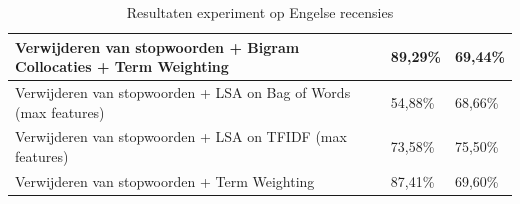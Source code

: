 \begin{table}[h]
\begin{adjustbox}{width=1\textwidth}
\begin{tabular}{|l|l|l|}
Verwijderen van stopwoorden + Bigram Collocaties + Term Weighting                   & 89,29\%                               & 69,44\%                      \\ \hline
Verwijderen van stopwoorden + LSA on Bag of Words (max features)                    & 54,88\%                               & 68,66\%                      \\ \hline
Verwijderen van stopwoorden + LSA on TFIDF (max features)                           & 73,58\%                               & 75,50\%                      \\ \hline
Verwijderen van stopwoorden + Term Weighting                                        & 87,41\%                               & 69,60\%                      \\ \hline
\end{tabular}
\end{adjustbox}
\caption{Resultaten experiment op Engelse recensies}
\end{table}

